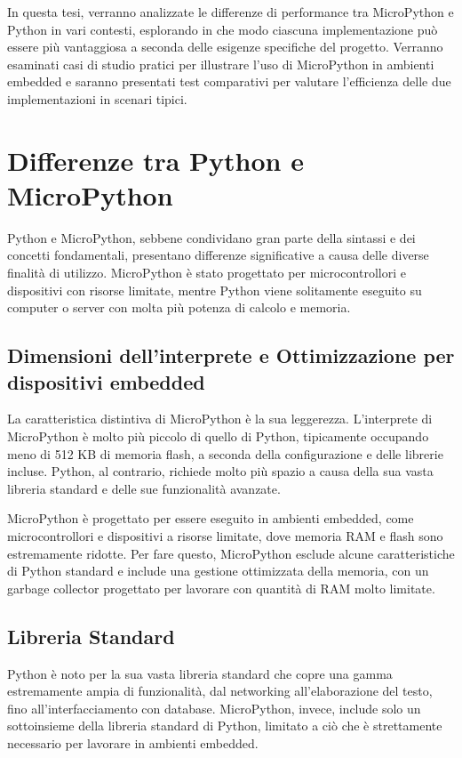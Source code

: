 \documentclass[12pt,a4paper]{report}
\begin{document}
In questa tesi, verranno analizzate le differenze di performance tra
MicroPython e Python in vari contesti, esplorando in che modo ciascuna
implementazione può essere più vantaggiosa a seconda delle esigenze
specifiche del progetto. Verranno esaminati casi di studio pratici per
illustrare l'uso di MicroPython in ambienti embedded e
saranno presentati test comparativi per valutare
l'efficienza delle due implementazioni in scenari
tipici.

\section{Differenze tra Python e MicroPython}

Python e MicroPython, sebbene condividano gran parte della sintassi e dei concetti fondamentali, presentano differenze significative a causa delle diverse finalità di utilizzo. MicroPython è stato progettato per microcontrollori e dispositivi con risorse limitate, mentre Python viene solitamente eseguito su computer o server con molta più potenza di calcolo e memoria.

\subsection{Dimensioni dell'interprete e Ottimizzazione per dispositivi embedded}

La caratteristica distintiva di MicroPython è la sua leggerezza. L'interprete di MicroPython è molto più piccolo di quello di Python, tipicamente occupando meno di 512 KB di memoria flash, a seconda della configurazione e delle librerie incluse. Python, al contrario, richiede molto più spazio a causa della sua vasta libreria standard e delle sue funzionalità avanzate.

MicroPython è progettato per essere eseguito in ambienti embedded, come microcontrollori e dispositivi a risorse limitate, dove memoria RAM e flash sono estremamente ridotte. Per fare questo, MicroPython esclude alcune caratteristiche di Python standard e include una gestione ottimizzata della memoria, con un garbage collector progettato per lavorare con quantità di RAM molto limitate.

\subsection{Libreria Standard}

Python è noto per la sua vasta libreria standard che copre una gamma estremamente ampia di funzionalità, dal networking all'elaborazione del testo, fino all'interfacciamento con database. MicroPython, invece, include solo un sottoinsieme della libreria standard di Python, limitato a ciò che è strettamente necessario per lavorare in ambienti embedded.
\end{document}
